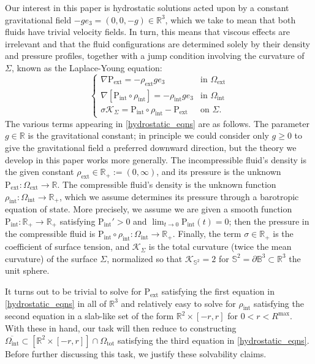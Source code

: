 \documentclass[11pt,reqno]{amsart}
\numberwithin{equation}{section}
\def\nab{\nabla}
\def\p{\partial}
\def\nab{\nabla}
\def\p{\partial}
\newcommand{\m}{\mathrm}
\def\pint{\m{P}_{\m{int}}}
\def\pext{\m{P}_{\m{ext}}}
\def\R{\mathbb{R}}
\begin{document}
Our interest in this paper is hydrostatic solutions acted upon by a constant gravitational field $-g e_3 = (0,0,-g) \in \R^3$, which we take to mean that both fluids have trivial velocity fields.   In turn, this means that viscous effects are irrelevant and that the fluid configurations are determined solely by their density and pressure profiles, together with a jump condition involving the curvature of $\Sigma$, known as the Laplace-Young equation:
\begin{equation}\label{hydrostatic_eqns}
\begin{cases}
\nab \pext = - \rho_{\m{ext}} g e_3 &\text{in } \Omega_{\m{ext}} \\ 
\nab [\pint \circ \rho_{\m{int}}] =  - \rho_{\m{int}} g e_3 &\text{in } \Omega_{\m{int}}  \\
\sigma \mathscr{K}_{\Sigma} = \pint\circ \rho_{\m{int}} - \pext &\text{on } \Sigma.
\end{cases}
\end{equation}
The various terms appearing in \eqref{hydrostatic_eqns} are as follows.  The parameter $g \in \R$ is the gravitational constant; in principle we could consider only $g \ge 0$ to give the gravitational field a preferred downward direction, but the theory we develop in this paper works more generally.  The incompressible fluid's density is the given constant $\rho_{\m{ext}}  \in \R_+ := (0,\infty)$, and its pressure is the unknown $\pext : \Omega_{\m{ext}} \to \R$.  The compressible fluid's density is the unknown function $\rho_{\m{int}} : \Omega_{\m{int}} \to \R_+$, which we assume determines its pressure through a barotropic equation of state.  More precisely, we assume we are given  a smooth function  $\pint : \R_+ \to \R_+$ satisfying $\pint' >0$ and $\lim_{t \to 0} \pint(t) =0$; then the pressure in the compressible fluid is $\pint \circ \rho_{\m{int}} : \Omega_{\m{int}} \to \R_+$.   Finally, the term $\sigma \in \R_+$ is the coefficient of surface tension, and $\mathscr{K}_{\Sigma}$ is the total curvature (twice the mean curvature) of the surface $\Sigma$, normalized so that $\mathscr{K}_{\mathbb{S}^2} = 2$ for $\mathbb{S}^2 =\p \mathbb{B}^3 \subset \R^3$ the  unit sphere.


It turns out to be trivial to solve for $\pext$ satisfying the first equation in \eqref{hydrostatic_eqns} in all of $\R^3$ and relatively easy to solve for $\rho_{\m{int}}$ satisfying the second equation in a slab-like set of the form $\R^2 \times [-r,r]$ for $0 < r < R^{\m{max}}$.  With these in hand, our task will then reduce   to constructing $\overline{\Omega_{\m{int}}} \subset [ \R^2 \times [-r,r]] \cap \Omega_{\m{tot}}$ satisfying the third equation in \eqref{hydrostatic_eqns}.  Before further discussing this task, we justify these solvability claims.
\end{document}
